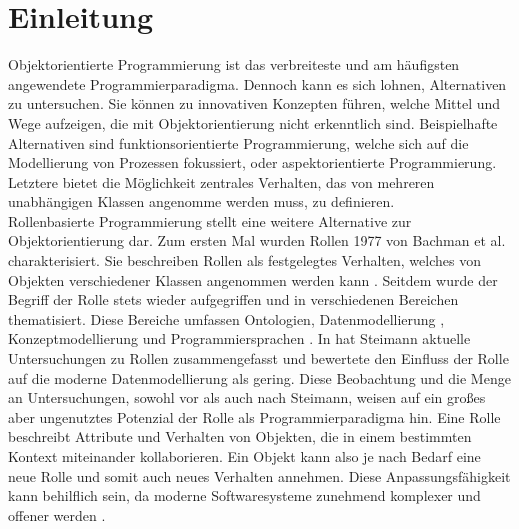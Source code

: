 \documentclass[conference]{IEEEtran}
\begin{document}
\section{Einleitung}
Objektorientierte Programmierung ist das verbreiteste und am häufigsten angewendete Programmierparadigma. Dennoch kann es sich lohnen, Alternativen zu untersuchen. Sie können zu innovativen Konzepten führen, welche Mittel und Wege aufzeigen, die mit Objektorientierung nicht erkenntlich sind. Beispielhafte Alternativen sind funktionsorientierte Programmierung, welche sich auf die Modellierung von Prozessen fokussiert, oder aspektorientierte Programmierung. Letztere bietet die Möglichkeit zentrales Verhalten, das von mehreren unabhängigen Klassen angenomme werden muss, zu definieren. \\ Rollenbasierte Programmierung stellt eine weitere Alternative zur Objektorientierung dar. Zum ersten Mal wurden Rollen 1977 von Bachman et al. charakterisiert. Sie beschreiben Rollen als festgelegtes Verhalten, welches von Objekten verschiedener Klassen angenommen werden kann \cite{bachman}. Seitdem wurde der Begriff der Rolle stets wieder aufgegriffen und in verschiedenen Bereichen thematisiert. Diese Bereiche umfassen Ontologien\cite{loebe2005abstract}\cite{guarino2009overview}, Datenmodellierung \cite{halpin2005orm}, Konzeptmodellierung \cite{hennicker2015model} und Programmiersprachen \cite{ubayashi2000roleep}. In \cite{steimann2000representation} hat Steimann aktuelle Untersuchungen zu Rollen zusammengefasst und bewertete den Einfluss der Rolle auf die moderne Datenmodellierung als gering. Diese Beobachtung und die Menge an Untersuchungen, sowohl vor als auch nach Steimann, weisen auf ein großes aber ungenutztes Potenzial der Rolle als Programmierparadigma hin. Eine Rolle beschreibt Attribute und Verhalten von Objekten, die in einem bestimmten Kontext miteinander kollaborieren. Ein Objekt kann also je nach Bedarf eine neue Rolle und somit auch neues Verhalten annehmen. Diese Anpassungsfähigkeit kann behilflich sein, da moderne Softwaresysteme zunehmend komplexer und offener werden \cite{murer2008managed}. \\
\end{document}
